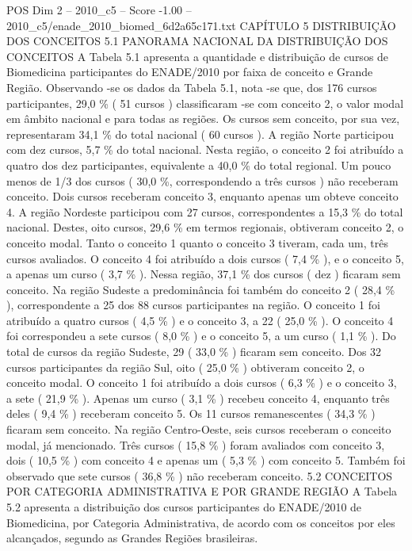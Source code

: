 \begin{textsample}{POS Dim 2 – 2010\_c5 – Score -1.00 – 2010\_c5/enade\_2010\_biomed\_6d2a65c171.txt}  \label{ex:f2_pos_326}
CAPÍTULO 5 DISTRIBUIÇÃO DOS CONCEITOS 5.1 PANORAMA NACIONAL DA DISTRIBUIÇÃO DOS CONCEITOS A Tabela 5.1 apresenta a quantidade e distribuição de cursos de Biomedicina participantes do ENADE/2010 por faixa de conceito e Grande Região.
Observando -se os dados da Tabela 5.1, nota -se que, dos 176 cursos participantes, 29,0 \% ( 51 cursos ) classificaram -se com conceito 2, o valor modal em âmbito nacional e para todas as regiões.
Os cursos sem conceito, por sua vez, representaram 34,1 \% do total nacional ( 60 cursos ).
A região Norte participou com dez cursos, 5,7 \% do total nacional.
Nesta região, o conceito 2 foi atribuído a quatro dos dez participantes, equivalente a 40,0 \% do total regional.
Um pouco menos de 1/3 dos cursos ( 30,0 \%, correspondendo a três cursos ) não receberam conceito.
Dois cursos receberam conceito 3, enquanto apenas um obteve conceito 4.
A região Nordeste participou com 27 cursos, correspondentes a 15,3 \% do total nacional.
Destes, oito cursos, 29,6 \% em termos regionais, obtiveram conceito 2, o conceito modal.
Tanto o conceito 1 quanto o conceito 3 tiveram, cada um, três cursos avaliados.
O conceito 4 foi atribuído a dois cursos ( 7,4 \% ), e o conceito 5, a apenas um curso ( 3,7 \% ).
Nessa região, 37,1 \% dos cursos ( dez ) ficaram sem conceito.
Na região Sudeste a predominância foi também do conceito 2 ( 28,4 \% ), correspondente a 25 dos 88 cursos participantes na região.
O conceito 1 foi atribuído a quatro cursos ( 4,5 \% ) e o conceito 3, a 22 ( 25,0 \% ).
O conceito 4 foi correspondeu a sete cursos ( 8,0 \% ) e o conceito 5, a um curso ( 1,1 \% ).
Do total de cursos da região Sudeste, 29 ( 33,0 \% ) ficaram sem conceito.
Dos 32 cursos participantes da região Sul, oito ( 25,0 \% ) obtiveram conceito 2, o conceito modal.
O conceito 1 foi atribuído a dois cursos ( 6,3 \% ) e o conceito 3, a sete ( 21,9 \% ).
Apenas um curso ( 3,1 \% ) recebeu conceito 4, enquanto três deles ( 9,4 \% ) receberam conceito 5.
Os 11 cursos remanescentes ( 34,3 \% ) ficaram sem conceito.
Na região Centro-Oeste, seis cursos receberam o conceito modal, já mencionado.
Três cursos ( 15,8 \% ) foram avaliados com conceito 3, dois ( 10,5 \% ) com conceito 4 e apenas um ( 5,3 \% ) com conceito 5.
Também foi observado que sete cursos ( 36,8 \% ) não receberam conceito. 5.2 CONCEITOS POR CATEGORIA ADMINISTRATIVA E POR GRANDE REGIÃO A Tabela 5.2 apresenta a distribuição dos cursos participantes do ENADE/2010 de Biomedicina, por Categoria Administrativa, de acordo com os conceitos por eles alcançados, segundo as Grandes Regiões brasileiras.

\end{textsample}
